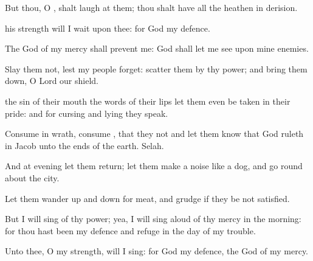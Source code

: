 {\Q {}But thou, O
{}, shalt
laugh at them; thou shalt have all the
heathen in
derision.


\par }{\Q {} his
strength will I
wait upon thee: for
God
{} my
defence.


\par }{\Q {}The
God of my
mercy shall
prevent me:
God shall let me
see
{} upon mine
enemies.


\par }{\Q {}Slay them not, lest my
people
forget:
scatter them by thy
power; and bring them
down, O
Lord our
shield.


\par }{\Q {} the
sin of their
mouth
{} the
words of their
lips let them even be
taken in their
pride: and for
cursing and
lying
{} they
speak.


\par }{\Q {}Consume
{} in
wrath,
consume
{}, that they
{} not
{} and let them
know that
God
ruleth in
Jacob unto the
ends of the
earth.
Selah.


\par }{\Q {}And at
evening let them
return;
{} let them make a
noise like a
dog, and go round
about the
city.


\par }{\Q {}Let them wander up and
down for
meat, and
grudge if they be not
satisfied.


\par }{\Q {}But I will
sing of thy
power; yea, I will sing
aloud of thy
mercy in the
morning: for thou hast been my
defence and
refuge in the
day of my
trouble.


\par }{\Q {}Unto thee, O my
strength, will I
sing: for
God
{} my
defence,
{} the
God of my
mercy.




\par }

